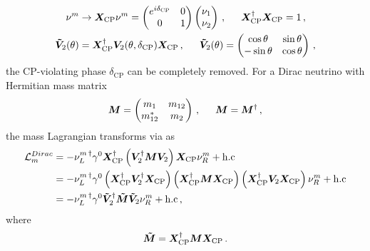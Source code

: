 \begin{alignat}{1}
	\label{cp:eq:03a} \nu^{m}&\rightarrow\bb{X}_{\mathrm{CP}}\nu^{m}= 
	\begin{pmatrix}
		e^{i\delta_{\mathrm{CP}}}& 0 \\
		0 & 1
	\end{pmatrix}
	\begin{pmatrix}
		\nu_{1}\\
		\nu_{2}
	\end{pmatrix}\,,\indent \bb{X}_{\mathrm{CP}}^{\dagger}\bb{X}_{\mathrm{CP}}=1\,,\\
	\label{cp:eq:03b}\bb{\tilde{V}}_{2}(\theta)&=\bb{X}_{\mathrm{CP}}^{\dagger}\bb{V}_{2}(\theta,\delta_{\mathrm{CP}})\bb{X}_{\mathrm{CP}}\,,\indent \bb{\tilde{V}}_{2}(\theta)=
	\begin{pmatrix}
		\cos{\theta}&\sin{\theta}\\
		-\sin{\theta}&\cos{\theta}
	\end{pmatrix}\,,
\end{alignat}
the CP-violating phase $\delta_{\mathrm{CP}}$ can be completely removed. For a Dirac neutrino with Hermitian mass matrix
\begin{alignat}{1}
	\label{cp:eq:04} \bb{M}=
	\begin{pmatrix}
		m_{1}&m_{12}\\
		m_{12}^{*}&m_{2}
	\end{pmatrix}\,,\indent \bb{M}=\bb{M}^{\dagger}\,,
\end{alignat}
the mass Lagrangian transforms via  as
\begin{alignat}{1}
	\notag \mathcal{L}_{m}^{Dirac}&=-\nu_{L}^{m\, \dagger}\gamma^{0}\boldsymbol{X}_{\mathrm{CP}}^{\dagger}\left(\boldsymbol{V}^{\dagger}_{2}\boldsymbol{M}\boldsymbol{V}_{2}\right)\boldsymbol{X}_{\mathrm{CP}}\nu_{R}^{m}+\mathrm{h.c}\\
	\notag &=-\nu_{L}^{m\, \dagger}\gamma^{0}\left(\boldsymbol{X}_{\mathrm{CP}}^{\dagger}\boldsymbol{V}^{\dagger}_{2}\boldsymbol{X}_{\mathrm{CP}}\right)\left(\boldsymbol{X}_{\mathrm{CP}}^{\dagger}\boldsymbol{M}\boldsymbol{X}_{\mathrm{CP}}\right)\left(\boldsymbol{X}_{\mathrm{CP}}^{\dagger}\boldsymbol{V}_{2}\boldsymbol{X}_{\mathrm{CP}}\right)\nu_{R}^{m}+\mathrm{h.c}\\
	\label{cp:eq:05a} &=-\nu_{L}^{m\, \dagger}\gamma^{0}\boldsymbol{\tilde{V}}^{\dagger}_{2}\boldsymbol{\tilde{M}}\boldsymbol{\tilde{V}}_{2}\nu_{R}^{m}+\mathrm{h.c}\,,
\end{alignat}
where
\begin{alignat}{1}
	\label{cp:eq:05b} \boldsymbol{\tilde{M}}=\boldsymbol{X}_{\mathrm{CP}}^{\dagger}\boldsymbol{M}\boldsymbol{X}_{\mathrm{CP}}\,.
\end{alignat}
